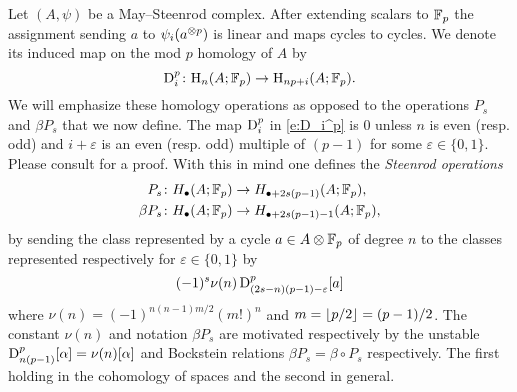 Let $(A,\psi)$ be a May--Steenrod complex.
After extending scalars to ${\mathbb{F}_p}$ the assignment sending $a$ to $\psi_i(a^{\otimes p})$ is linear and maps cycles to cycles.
We denote its induced map on the mod $p$ homology of $A$ by
\begin{equation}\label{e:D_i^p}
	\mathrm{D}_i^p \colon \mathrm{H}_n(A; {\mathbb{F}_p}) \to \mathrm{H}_{np+i}(A; {\mathbb{F}_p}).
\end{equation}
We will emphasize these homology operations as opposed to the operations $P_s$ and $\beta P_s$ that we now define.
The map $\mathrm{D}_i^p$ in \eqref{e:D_i^p} is $0$ unless $n$ is even (resp. odd) and $i+\varepsilon$ is an even (resp. odd) multiple of $(p-1)$ for some $\varepsilon \in \{0,1\}$.
Please consult \cite[Proposition 2.3. (iv)]{may1970general} for a proof.
With this in mind one defines the \textit{Steenrod operations}
\begin{align*}
	P_s \colon& H_\bullet(A; {\mathbb{F}_p}) \to H_{\bullet + 2s(p-1)}(A; {\mathbb{F}_p}), \\
	\beta P_s \colon& H_\bullet(A; {\mathbb{F}_p}) \to H_{\bullet + 2s(p-1) - 1}(A; {\mathbb{F}_p}),
\end{align*}
by sending the class represented by a cycle $a \in A \otimes {\mathbb{F}_p}$ of degree $n$ to the classes represented respectively for $\varepsilon \in \{0,1\}$ by
\begin{equation*}
	(-1)^s \nu(n) \, \mathrm{D}^p_{(2s-n)(p-1)-\varepsilon}[a]
\end{equation*}
where $\nu(n) = (-1)^{n(n-1)m/2}(m!)^n$ and $m = \lfloor p/2\rfloor = (p-1)/2$.
The constant $\nu(n)$ and notation $\beta P_s$ are motivated respectively by the unstable $\mathrm{D}_{n(p-1)}^p[\alpha] = \nu(n)[\alpha]$ and Bockstein relations $\beta P_s = \beta \circ P_s$ respectively.
The first holding in the cohomology of spaces and the second in general.